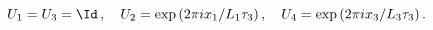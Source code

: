 \begin{equation}
\label{transition-1}
U_1 = U_3 = \Id \, , \quad 
U_2 = \exp{(2 \pi i x_1/L_1 \tau_3)} \, , \quad 
U_4 = \exp{(2 \pi i x_3/L_3 \tau_3)} \, .
\end{equation}

